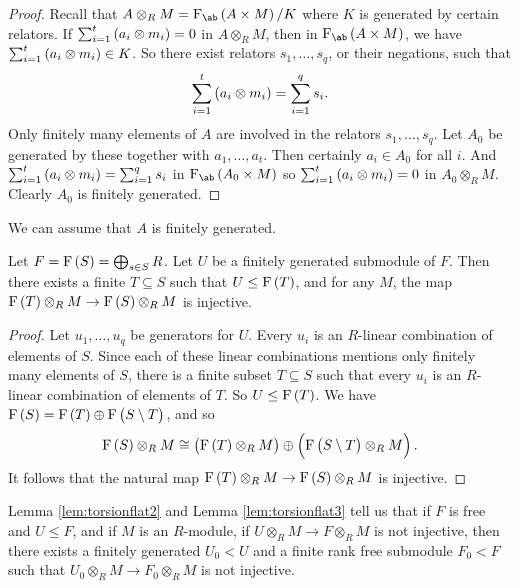 \begin{proof}
Recall that $ A \otimes_R M = \F_{\ab}\br{A \times M} / K $ where $ K $ is generated by certain relators. If $ \sum_{i = 1}^t \br{a_i \otimes m_i} = 0 $ in $ A \otimes_R M $, then in $ \F_{\ab}\br{A \times M} $, we have $ \sum_{i = 1}^t \br{a_i \otimes m_i} \in K $. So there exist relators $ s_1, \dots, s_q $, or their negations, such that
$$ \sum_{i = 1}^t \br{a_i \otimes m_i} = \sum_{i = 1}^q s_i. $$
Only finitely many elements of $ A $ are involved in the relators $ s_1, \dots, s_q $. Let $ A_0 $ be generated by these together with $ a_1, \dots, a_t $. Then certainly $ a_i \in A_0 $ for all $ i $. And $ \sum_{i = 1}^t \br{a_i \otimes m_i} = \sum_{i = 1}^q s_i $ in $ \F_{\ab}\br{A_0 \times M} $ so $ \sum_{i = 1}^t \br{a_i \otimes m_i} = 0 $ in $ A_0 \otimes_R M $. Clearly $ A_0 $ is finitely generated.
\end{proof}


We can assume that $ A $ is finitely generated.

\begin{lemma}
\label{lem:torsionflat3}
Let $ F = \F\br{S} = \bigoplus_{s \in S} R $. Let $ U $ be a finitely generated submodule of $ F $. Then there exists a finite $ T \subseteq S $ such that $ U \le \F\br{T} $, and for any $ M $, the map $ \F\br{T} \otimes_R M \to \F\br{S} \otimes_R M $ is injective.
\end{lemma}

\begin{proof}
Let $ u_1, \dots, u_q $ be generators for $ U $. Every $ u_i $ is an $ R $-linear combination of elements of $ S $. Since each of these linear combinations mentions only finitely many elements of $ S $, there is a finite subset $ T \subseteq S $ such that every $ u_i $ is an $ R $-linear combination of elements of $ T $. So $ U \le \F\br{T} $. We have $ \F\br{S} = \F\br{T} \oplus \F\br{S \setminus T} $, and so
$$ \F\br{S} \otimes_R M \cong \br{\F\br{T} \otimes_R M} \oplus \br{\F\br{S \setminus T} \otimes_R M}. $$
It follows that the natural map $ \F\br{T} \otimes_R M \to \F\br{S} \otimes_R M $ is injective.
\end{proof}

\pagebreak

Lemma \ref{lem:torsionflat2} and Lemma \ref{lem:torsionflat3} tell us that if $ F $ is free and $ U \le F $, and if $ M $ is an $ R $-module, if $ U \otimes_R M \to F \otimes_R M $ is not injective, then there exists a finitely generated $ U_0 < U $ and a finite rank free submodule $ F_0 < F $ such that $ U_0 \otimes_R M \to F_0 \otimes_R M $ is not injective.

